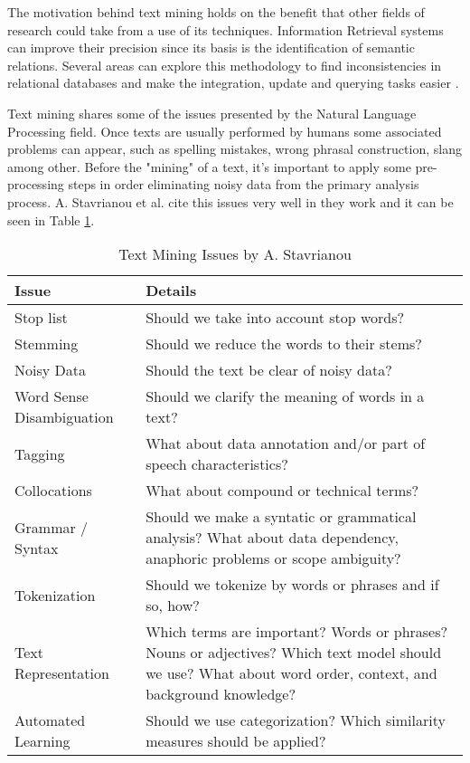 The motivation behind text mining holds on the benefit that other fields of research could take from a use of its techniques. Information Retrieval systems can improve their precision since its basis is the identification of semantic relations. Several areas can explore this methodology to find inconsistencies in relational databases and make the integration, update and querying tasks easier \cite{kn:Stavrianou2007}.

Text mining shares some of the issues presented by the Natural Language Processing field. Once texts are usually performed by humans some associated problems can appear, such as spelling mistakes, wrong phrasal construction, slang among other. Before the "mining" of a text, it's important to apply some pre-processing steps in order eliminating noisy data from the primary analysis process.
A. Stavrianou et al. cite this issues very well in they work and it can be seen in Table \ref{table:textminingissues}.

\begin{table}[]
\centering
\caption{Text Mining Issues by A. Stavrianou \cite{kn:Stavrianou2007}}
\label{table:textminingissues}
\begin{tabular}{ | l | p{7cm} |}
\hline \textbf{Issue}            & \textbf{Details}\\
\hline Stop list                 & Should we take into account stop words?\\ 
\hline Stemming                  & Should we reduce the words to their stems?\\ 
\hline Noisy Data                & Should the text be clear of noisy data?\\ 
\hline Word Sense Disambiguation & Should we clarify the meaning of words in a text?\\ 
\hline Tagging                   & What about data annotation and/or part of speech characteristics?\\ 
\hline Collocations              & What about compound or technical terms?\\ 
\hline Grammar / Syntax          & Should we make a syntatic or grammatical analysis? What about data dependency, anaphoric problems or scope ambiguity?\\ 
\hline Tokenization              & Should we tokenize by words or phrases and if so, how?\\ 
\hline Text Representation       & Which terms are important? Words or phrases? Nouns or adjectives? Which text model should we use? What about word order, context, and background knowledge? \\ 
\hline Automated Learning        & Should we use categorization? Which similarity measures should be applied? \\ \hline
\end{tabular}
\end{table}

